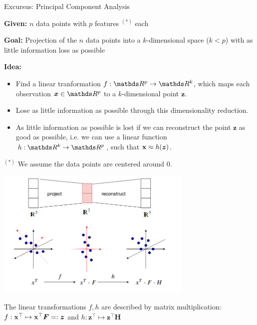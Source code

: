 \documentclass[11pt,compress,t,notes=noshow, xcolor=table]{beamer}
\begin{document}
\begin{vbframe}{Excursus: Principal Component Analysis}

\textbf{Given: } $n$ data points with $p$ features $^{(*)}$ each

\lz

\textbf{Goal: } Projection of the $n$ data points into a $k$-dimensional space ($k < p$) with as little information loss as possible

\lz

\textbf{Idea: }

\begin{itemize}
\item Find a linear tranformation $f: \R^p \to \R^k$, which maps each observation $\bm{x}\in \R^p$ to a $k$-dimensional point $\bm{z}$.
\item Lose as little information as possible through this dimensionality reduction.
\item As little information as possible is lost if we can reconstruct the point $\bm{z}$ as good as possible, i.e. we can use a linear function $h: \R^k \to \R^p$, such that $\mathbf{x} \approx h(\bm{z})$.
\end{itemize}

\vfill

$^{(*)}$ We assume the data points are centered around $0$.

\framebreak

\begin{center}
  \includegraphics[width = 0.7\textwidth]{figure_man/ignore/matrixapproxi_s18.png}
\end{center}


The linear transformations $f, h$ are described by matrix multiplication: $f: \mathbf{x}^\top \mapsto \mathbf{x}^\top \bm{F} =: \bm{z}$ and $h: \bm{z}^\top \mapsto \bm{z}^\top \bm{H}$


\end{vbframe}
\end{document}
